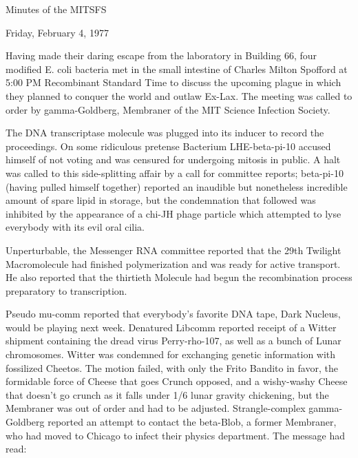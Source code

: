 \documentclass[12pt]{article}
\begin{document}
\begin{center}

Minutes of the MITSFS

Friday, February 4, 1977

\end{center}
 
\vspace{12pt}

\setlength{\parskip}{6pt}

\noindent
Having made their daring escape from the laboratory in Building 66, four modified E. coli bacteria met in the small intestine of Charles Milton Spofford at 5:00 PM Recombinant Standard Time to discuss the upcoming plague in which they planned to conquer the world and outlaw Ex-Lax. The meeting was called to order by gamma-Goldberg, Membraner of the MIT Science Infection Society.

The DNA transcriptase molecule was plugged into its inducer to record the proceedings. On some ridiculous pretense Bacterium LHE-beta-pi-10 accused himself of not voting and was censured for undergoing mitosis in public. A halt was called to this side-splitting affair by a call for committee reports; beta-pi-10 (having pulled himself together) reported an inaudible but nonetheless incredible amount of spare lipid in storage, but the condemnation that followed was inhibited by the appearance of a chi-JH phage particle which attempted to lyse everybody with its evil oral cilia.

Unperturbable, the Messenger RNA committee reported that the 29th Twilight Macromolecule had finished polymerization and was ready for active transport. He also reported that the thirtieth Molecule had begun the recombination process preparatory to transcription.

Pseudo mu-comm reported that everybody's favorite DNA tape, Dark Nucleus, would be playing next week. Denatured Libcomm reported receipt of a Witter shipment containing the dread virus Perry-rho-107, as well as a bunch of Lunar chromosomes. Witter was condemned for exchanging genetic information with fossilized Cheetos. The motion failed, with only the Frito Bandito in favor, the formidable force of Cheese that goes Crunch opposed, and a wishy-washy Cheese that doesn't go crunch as it falls under 1/6 lunar gravity chickening, but the Membraner was out of order and had to be adjusted. Strangle-complex gamma-Goldberg reported an attempt to contact the beta-Blob, a former Membraner, who had moved to Chicago to infect their physics department. The message had read:
\end{document}
